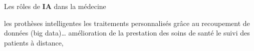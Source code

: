 \begin{frame}{Les rôles de \textbf{IA} dans la médecine}
    \begin{enumerate}[<+-|alert@+>]
        \myitem les prothèses intelligentes
        \myitem les traitements personnalisés grâce au recoupement de données (big data)… 
        \myitem amélioration de la prestation des soins de santé
        \myitem le suivi des patients à distance,
    \end{enumerate}
    \vspace{80mm}
\end{frame}

